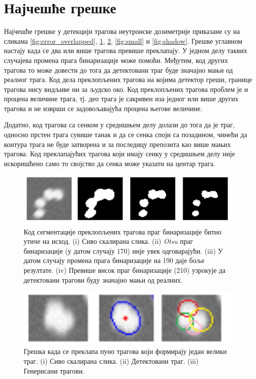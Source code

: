 \documentclass[11pt,a4paper,serbian,oneside]{book}
\begin{document}
\section{Најчешће грешке}

Најчешће грешке у детекцији трагова неутронске дозиметрије приказане су на сликама \ref{fig:error_overlapped}, \ref{fig:binthresh}, \ref{fig:multi}, \ref{fig:small} и \ref{fig:shadow}. Грешке углавном настају када се два или више  трагова превише преклапају. У једном делу таквих случајева промена прага бинаризације може помоћи. Међутим, код других трагова то може довести до тога да детектовани траг буде значајно мањи од реалног трага. Код дела преклопљених трагова на којима детектор греши, границе трагова нису видљиве ни за људско око. Код преклопљених трагова проблем је и процена величине трага, тј. део трага је сакривен иза једног или више других трагова и не изврши се задовољавајућа процена његове величине.

Додатно, код трагова са сенком у средишњем делу долази до тога да је траг, односно прстен трага сувише танак и да се сенка споји са позадином, чинећи да контура трага не буде затворена и за последицу препознта као више мањих трагова. Код преклапајућих трагова који имају сенку у средишњем делу није искоришћено само то својство да сенка може указати на центар трага. 


\begin{figure}[H]
\begin{center}
\includegraphics[width=150mm]{images/binthresh.png}
\end{center}
\caption{Код сегментације преклопљених трагова праг бинаризације битно утиче на исход. (i) Сиво скалирана слика. (ii) \textit{Otsu}  праг бинаризације (у датом случају 170) није увек одговарајући. (iii) У датом случају промена прага бинаризације на 190 даје боље резултате. (iv) Превише висок праг бинаризације (210) узрокује да детектовани трагови буду значајно мањи од реалних. }
\label{fig:binthresh}
\end{figure}

\begin{figure}[H]
\begin{center}
\includegraphics[width=150mm]{images/multi.png}
\end{center}
\caption{Грешка када се преклапа пуно трагова који формирају један велики траг. (i) Сиво скалирана слика. (ii) Детектовани траг.  (iii) Генерисани трагови. }
\label{fig:multi}
\end{figure}
\end{document}

